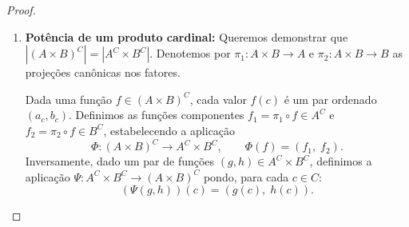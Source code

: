 \begin{proof}
\begin{enumerate}
              Verificamos explicitamente que \(\Psi\) é a inversa bilateral de \(\Phi\):
              \begin{itemize}
                  \item Para toda função \(f \in A^{B \cup C}\), temos:
                        \[
                            \Psi(\Phi(f)) = \Psi(f|_B, f|_C) = (f|_B) \cup (f|_C).
                        \]
                        Como todo elemento \(x \in B \cup C\) pertence exclusivamente a \(B\) ou a \(C\), se \(x \in B\) temos \(((f|_B) \cup (f|_C))(x) = f|_B(x) = f(x)\), e se \(x \in C\) temos \(((f|_B) \cup (f|_C))(x) = f|_C(x) = f(x)\). Logo, \((f|_B) \cup (f|_C) = f\), o que estabelece que
                        \[
                            \Psi(\Phi(f)) = f \implies \Psi \circ \Phi = \operatorname{id}_{A^{B \cup C}}.
                        \]
                  \item Para todo par \((g, h) \in A^B \times A^C\), temos:
                        \[
                            \Phi(\Psi(g, h)) = \Phi(g \cup h) = \left((g \cup h)|_B, \; (g \cup h)|_C\right).
                        \]
                        Pela própria definição de \(g \cup h\), para todo \(b \in B\) tem-se \((g \cup h)|_B(b) = (g \cup h)(b) = g(b)\), logo \((g \cup h)|_B = g\). De modo análogo, para todo \(c \in C\) tem-se \((g \cup h)|_C(c) = (g \cup h)(c) = h(c)\), logo \((g \cup h)|_C = h\). Portanto:
                        \[
                            \Phi(\Psi(g, h)) = (g, h) \implies \Phi \circ \Psi = \operatorname{id}_{A^B \times A^C}.
                        \]
              \end{itemize}
              Pela \autoref{prop:caracterizacao_bijecao_inversa}, segue-se que \(\Phi\) é uma bijeção, estabelecendo que \(|A^{B \cup C}| = |A^B \times A^C|\), isto é, \(|A|^{|B| + |C|} = |A|^{|B|} \cdot |A|^{|C|}\).

        \item \textbf{Potência de um produto cardinal:} Queremos demonstrar que \(|(A \times B)^C| = |A^C \times B^C|\). Denotemos por \(\pi_1: A \times B \to A\) e \(\pi_2: A \times B \to B\) as projeções canônicas nos fatores.

              Dada uma função \(f \in (A \times B)^C\), cada valor \(f(c)\) é um par ordenado \((a_c, b_c)\). Definimos as funções componentes \(f_1 = \pi_1 \circ f \in A^C\) e \(f_2 = \pi_2 \circ f \in B^C\), estabelecendo a aplicação
              \[
                  \Phi: (A \times B)^C \to A^C \times B^C, \qquad \Phi(f) = (f_1, \; f_2).
              \]
              Inversamente, dado um par de funções \((g, h) \in A^C \times B^C\), definimos a aplicação \(\Psi: A^C \times B^C \to (A \times B)^C\) pondo, para cada \(c \in C\):
              \[
                  (\Psi(g, h))(c) = (g(c), \; h(c)).
              \]


\end{enumerate}
\end{proof}
